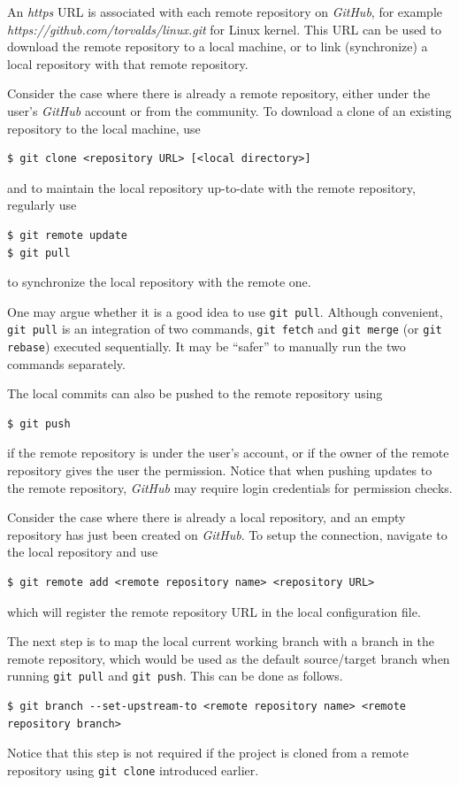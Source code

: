 An \textit{https} URL is associated with each remote repository on \textit{GitHub}, for example \textit{https://github.com/torvalds/linux.git} for Linux kernel. This URL can be used to download the remote repository to a local machine, or to link (synchronize) a local repository with that remote repository.

Consider the case where there is already a remote repository, either under the user's \textit{GitHub} account or from the community. To download a clone of an existing repository to the local machine, use
\begin{lstlisting}
$ git clone <repository URL> [<local directory>]
\end{lstlisting}
and to maintain the local repository up-to-date with the remote repository, regularly use
\begin{lstlisting}
$ git remote update
$ git pull
\end{lstlisting}
to synchronize the local repository with the remote one.

\begin{shortbox}
One may argue whether it is a good idea to use \verb|git pull|. Although convenient, \verb|git pull| is an integration of two commands, \verb|git fetch| and \verb|git merge| (or \verb|git rebase|) executed sequentially. It may be ``safer'' to manually run the two commands separately.
\end{shortbox}

The local commits can also be pushed to the remote repository using
\begin{lstlisting}
$ git push
\end{lstlisting}
if the remote repository is under the user's account, or if the owner of the remote repository gives the user the permission. Notice that when pushing updates to the remote repository, \textit{GitHub} may require login credentials for permission checks.

Consider the case where there is already a local repository, and an empty repository has just been created on \textit{GitHub}. To setup the connection, navigate to the local repository and use
\begin{lstlisting}
$ git remote add <remote repository name> <repository URL>
\end{lstlisting}
which will register the remote repository URL in the local configuration file.

The next step is to map the local current working branch with a branch in the remote repository, which would be used as the default source/target branch when running \verb|git pull| and \verb|git push|. This can be done as follows.
\begin{lstlisting}
$ git branch --set-upstream-to <remote repository name> <remote repository branch>
\end{lstlisting}
Notice that this step is not required if the project is cloned from a remote repository using \verb|git clone| introduced earlier.

